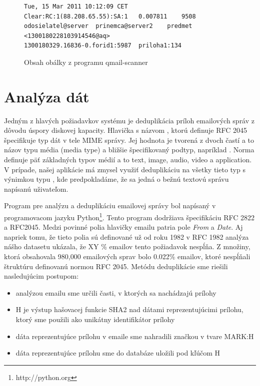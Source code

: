 \documentclass[11pt,twoside,a4paper]{book}
\begin{document}
\begin{figure}[h]
\begin{verbatim}
Tue, 15 Mar 2011 10:12:09 CET	Clear:RC:1(88.208.65.55):SA:1	0.007811	9508	odosielatel@server	prinemca@server2	predmet	<1300180228103914546@aq>	
1300180329.16836-0.forid1:5987	priloha1:134
\end{verbatim}
 \caption{Obsah obálky z programu qmail-scanner}
 \label{fig:envelope}
\end{figure}


\section{Analýza dát}
Jedným z hlavých požiadavkov systému je deduplikácia príloh emailových správ z dôvodu úspory diskovej kapacity. Hlavička s názvom \emph{}, ktorú definuje RFC 2045 špecifikuje typ dát v tele MIME správy. Jej hodnota je tvorená z dvoch častí a to názov typu média (media type) a bližšie špecifikovaný podtyp, napríklad \emph{}. Norma definuje päť základných typov médií a to text, image, audio, video a application. V prípade, našej aplikácie má zmysel využiť deduplikáciu na všetky tieto typ s výnimkou typu \emph{}, kde predpokladáme, že sa jedná o bežnú textovú správu napísanú uživateľom.

Program pre analýzu a deduplikáciu emailovej správy bol napísaný v programovacom jazyku Python\footnote{http://python.org}. Tento program dodržiava špecifikáciu RFC 2822 a RFC2045. 
Medzi povinné polia hlavičky emailu patria pole \emph{From} a \emph{Date}. Aj napriek tomu, že tieto polia sú definované už od roku 1982 v RFC 1982 analýza nášho datasetu ukázala, že XY \% emailov tento požiadavok nespĺňa. Z množiny, ktorá obsahovala 980,000 emailových sprav bolo 0.022\% emailov, ktoré nespĺňali štruktúru definovanú normou RFC 2045. Metódu deduplikácie sme riešili nasledujúcim postupom:

\begin{itemize}
 \item analýzou emailu sme určili časti, v ktorých sa nachádzajú prílohy
 \item H je výstup hašovacej funkcie SHA2 nad dátami reprezentujúcimi prílohu, ktorý sme použili ako unikátny identifikátor prílohy
 \item dáta reprezentujúce prílohu v emaile sme nahradili značkou v tvare MARK:H
 \item dáta reprezentujúce prílohu sme do databáze uložili pod kľúčom H
\end{itemize}
\end{document}
